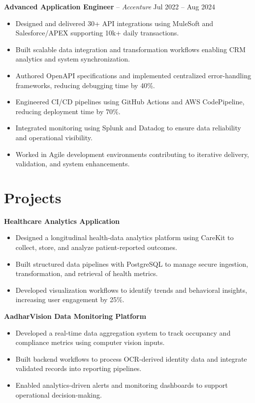 \documentclass[letterpaper,11pt]{article}
\begin{document}
\textbf{Advanced Application Engineer} – \textit{Accenture} \hfill Jul 2022 -- Aug 2024
\begin{itemize}
\item Designed and delivered 30+ API integrations using MuleSoft and Salesforce/APEX supporting 10k+ daily transactions.
\item Built scalable data integration and transformation workflows enabling CRM analytics and system synchronization.
\item Authored OpenAPI specifications and implemented centralized error-handling frameworks, reducing debugging time by 40\%.
\item Engineered CI/CD pipelines using GitHub Actions and AWS CodePipeline, reducing deployment time by 70\%.
\item Integrated monitoring using Splunk and Datadog to ensure data reliability and operational visibility.
\item Worked in Agile development environments contributing to iterative delivery, validation, and system enhancements.
\end{itemize}

\section*{Projects}

\textbf{Healthcare Analytics Application}
\begin{itemize}
\item Designed a longitudinal health-data analytics platform using CareKit to collect, store, and analyze patient-reported outcomes.
\item Built structured data pipelines with PostgreSQL to manage secure ingestion, transformation, and retrieval of health metrics.
\item Developed visualization workflows to identify trends and behavioral insights, increasing user engagement by 25\%.
\end{itemize}


\textbf{AadharVision Data Monitoring Platform}
\begin{itemize}
\item Developed a real-time data aggregation system to track occupancy and compliance metrics using computer vision inputs.
\item Built backend workflows to process OCR-derived identity data and integrate validated records into reporting pipelines.
\item Enabled analytics-driven alerts and monitoring dashboards to support operational decision-making.
\end{itemize}
\end{document}

